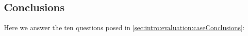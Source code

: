%
%



%
\subsection{Conclusions}

 Here we answer the ten questions posed in
 \autoref{sec:intro:evaluation:caseConclusions}:

